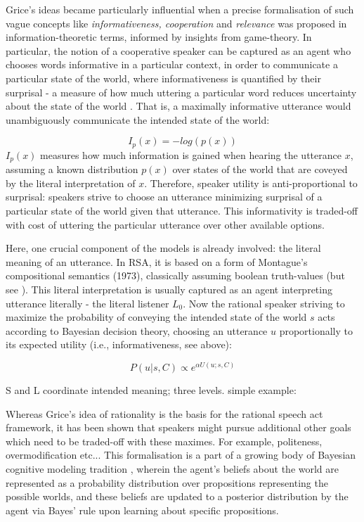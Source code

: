 Grice’s ideas became particularly influential when a precise formalisation of such vague concepts like \emph{informativeness, cooperation} and \emph{relevance} was proposed in information-theoretic terms, informed by insights from game-theory.
In particular, the notion of a cooperative speaker can be captured as an agent who chooses words informative in a particular context, in order to communicate a particular state of the world, where informativeness is quantified by their surprisal - a measure of how much uttering a particular word reduces uncertainty about the state of the world \parencite{frank2012predicting}. That is, a maximally informative utterance would unambiguously communicate the intended state of the world: 

$$I_p(x) = - log(p(x))$$  
$I_p(x)$ measures how much information is gained when hearing the utterance $x$, assuming a known distribution $p(x)$ over states of the world that are coveyed by the literal interpretation of $x$. Therefore, speaker utility is anti-proportional to surprisal: speakers strive to choose an utterance minimizing surprisal of a particular state of the world given that utterance. 
This informativity is traded-off with cost of uttering the particular utterance over other available options. 
 
Here, one crucial component of the models is already involved: the literal meaning of an utterance. In RSA, it is based on a form of Montague’s compositional semantics (1973), classically assuming boolean truth-values (but see \textcite{degen2020redundancy}). 
This literal interpretation is usually captured as an agent interpreting utterance literally - the literal listener $L_0$. 
Now the rational speaker striving to maximize the probability of conveying the intended state of the world $s$ acts according to Bayesian decision theory, choosing an utterance $u$ proportionally to its expected utility (i.e., informativeness, see above):

$$P(u | s, C) \propto e^{\alpha U (u; s, C)}$$


S and L coordinate intended meaning; three levels. simple example: \parencite{goodman2016}

Whereas Grice’s idea of rationality is the basis for the rational speech act framework, it has been shown that speakers might pursue additional other goals which need to be traded-off with these maximes. For example, politeness, overmodification etc...  
This formalisation is a part of a growing body of Bayesian cognitive modeling tradition \parencite{tenenbaum2011grow}, wherein the agent’s beliefs about the world are represented as a probability distribution over propositions representing the possible worlds, and these beliefs are updated to a posterior distribution by the agent via Bayes’ rule upon learning about specific propositions. 

